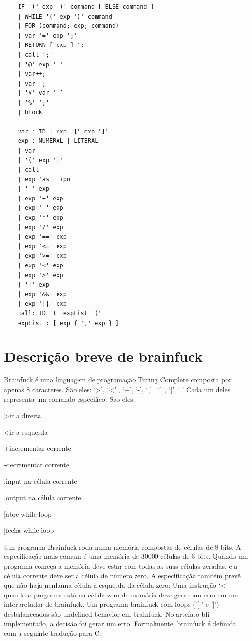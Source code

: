 \begin{verbatim}
    IF '(' exp ')' command [ ELSE command ]
    | WHILE '(' exp ')' command
    | FOR (command; exp; command)
    | var '=' exp ';'
    | RETURN [ exp ] ';'
    | call ';'
    | '@' exp ';'
    | var++;
    | var--;
    | '#' var ‘;’
    | ‘%' ‘;'
    | block

    var : ID | exp '[' exp ']'
    exp : NUMERAL | LITERAL
    | var
    | '(' exp ')'
    | call
    | exp 'as' tipo
    | '-' exp
    | exp '+' exp
    | exp '-' exp
    | exp '*' exp
    | exp '/' exp
    | exp '==' exp
    | exp '<=' exp
    | exp '>=' exp
    | exp '<' exp
    | exp '>' exp
    | '!' exp
    | exp '&&' exp
    | exp '||' exp
    call: ID '(' expList ')'
    expList : [ exp { ',' exp } ]
\end{verbatim}

\chapter{Descrição breve de brainfuck}

Brainfuck é uma linguagem de programação Turing Complete composta por apenas 8 caracteres. São eles: ‘>’, ‘<’ , ‘+’, ‘-’, ‘,’ , ‘.’ , ‘[’, ‘]’ 
Cada um deles representa um comando específico. São eles:

>\hspace*{1.5cm}ir a direita

<\hspace*{1.5cm}ir a esquerda

+\hspace*{1.5cm}incrementar corrente

-\hspace*{1.5cm}decrementar corrente 

,\hspace*{1.5cm}input na célula corrente

.\hspace*{1.5cm}output na célula corrente

[\hspace*{1.5cm}abre while loop

]\hspace*{1.5cm}fecha while loop


Um programa Brainfuck roda numa memória compostas de células de 8 bits. A especificação mais comum é uma memória de 30000 células de 8 bits. Quando um programa começa a memória deve estar com todas as suas células zeradas, e a célula corrente deve ser a célula de número zero. A especificação também prevê que não haja nenhuma célula à esquerda da célula zero: Uma instrução ‘<’ quando o programa está na célula zero de memória deve gerar um erro em um interpretador de brainfuck.
Um programa brainfuck com loops  ('[ ' e ']') desbalanceados são undefined behavior em brainfuck. No artefato bfi implementado, a decisão foi gerar um erro.
Formalmente, brainfuck é definida com a seguinte tradução para C:

